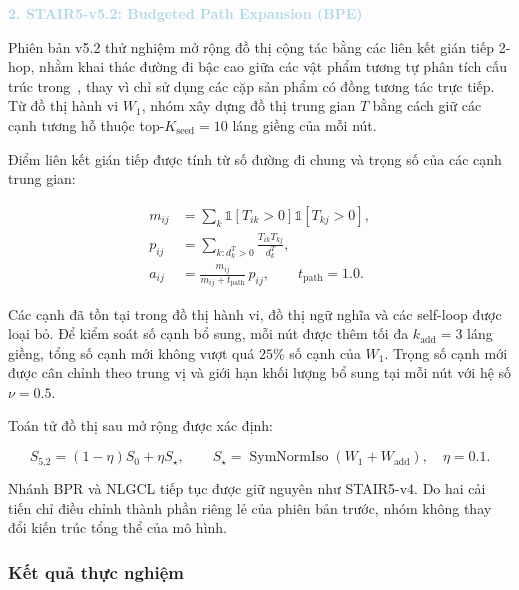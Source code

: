 \noindent\textcolor{lightblue}{\textbf{2. STAIR5-v5.2: Budgeted Path Expansion (BPE)}}

Phiên bản v5.2 thử nghiệm mở rộng đồ thị cộng tác bằng các liên kết gián tiếp 2-hop, nhằm khai thác đường đi bậc cao giữa các vật phẩm tương tự phân tích cấu trúc trong~\cite{sakurai2026edge}, thay vì chỉ sử dụng các cặp sản phẩm có đồng tương tác trực tiếp. Từ đồ thị hành vi $W_1$, nhóm xây dựng đồ thị trung gian $T$ bằng cách giữ các cạnh tương hỗ thuộc top-$K_{\mathrm{seed}}=10$ láng giềng của mỗi nút.


Điểm liên kết gián tiếp được tính từ số đường đi chung và trọng số của các cạnh trung gian:

\begin{equation}
\begin{aligned}
m_{ij}
&=
\sum_k
\mathbb{1}[T_{ik}>0]
\mathbb{1}[T_{kj}>0],\\
p_{ij}
&=
\sum_{k:d_k^T>0}
\frac{T_{ik}T_{kj}}{d_k^T},\\
a_{ij}
&=
\frac{m_{ij}}{m_{ij}+t_{\mathrm{path}}}\,p_{ij},
\qquad t_{\mathrm{path}}=1.0.
\end{aligned}
\end{equation}

Các cạnh đã tồn tại trong đồ thị hành vi, đồ thị ngữ nghĩa và các self-loop được loại bỏ. Để kiểm soát số cạnh bổ sung, mỗi nút được thêm tối đa $k_{\mathrm{add}}=3$ láng giềng, tổng số cạnh mới không vượt quá $25\%$ số cạnh của $W_1$. Trọng số cạnh mới được cân chỉnh theo trung vị và giới hạn khối lượng bổ sung tại mỗi nút với hệ số $\nu=0.5$.

Toán tử đồ thị sau mở rộng được xác định:

\begin{equation}
S_{5.2}
=
(1-\eta)S_0+\eta S_{\star},
\qquad
S_{\star}
=
\operatorname{SymNormIso}
\left(W_1+W_{\mathrm{add}}\right),
\quad \eta=0.1.
\end{equation}

Nhánh BPR và NLGCL tiếp tục được giữ nguyên như STAIR5-v4. Do hai cải tiến chỉ điều chỉnh thành phần riêng lẻ của phiên bản trước, nhóm không thay đổi kiến trúc tổng thể của mô hình.


\subsubsection{Kết quả thực nghiệm}

